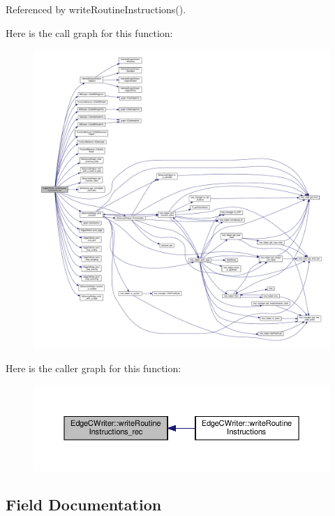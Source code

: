 Referenced by write\+Routine\+Instructions().

Here is the call graph for this function\+:
\nopagebreak
\begin{figure}[H]
\begin{center}
\leavevmode
\includegraphics[width=350pt]{d7/dee/classEdgeCWriter_a8bd9dbf867c6937dd51d309ef4f27073_cgraph}
\end{center}
\end{figure}
Here is the caller graph for this function\+:
\nopagebreak
\begin{figure}[H]
\begin{center}
\leavevmode
\includegraphics[width=350pt]{d7/dee/classEdgeCWriter_a8bd9dbf867c6937dd51d309ef4f27073_icgraph}
\end{center}
\end{figure}


\subsection{Field Documentation}
\mbox{\label{classEdgeCWriter_a49c0cee264f99741c51a888c52a4e429}} 
